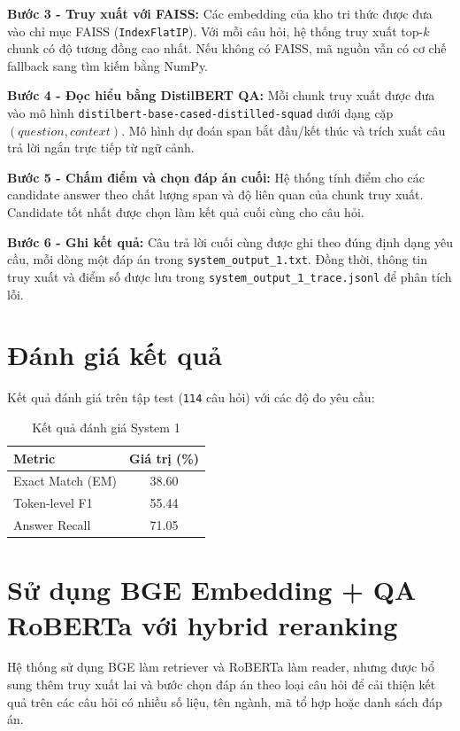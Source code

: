 \documentclass[12pt,a4paper]{report}
\begin{document}
\textbf{Bước 3 - Truy xuất với FAISS:}
Các embedding của kho tri thức được đưa vào chỉ mục FAISS (\texttt{IndexFlatIP}). Với mỗi câu hỏi, hệ thống truy xuất top-\(k\) chunk có độ tương đồng cao nhất. Nếu không có FAISS, mã nguồn vẫn có cơ chế fallback sang tìm kiếm bằng NumPy.

\textbf{Bước 4 - Đọc hiểu bằng DistilBERT QA:}
Mỗi chunk truy xuất được đưa vào mô hình \texttt{distilbert-base-cased-distilled-squad} dưới dạng cặp \((question, context)\). Mô hình dự đoán span bắt đầu/kết thúc và trích xuất câu trả lời ngắn trực tiếp từ ngữ cảnh.

\textbf{Bước 5 - Chấm điểm và chọn đáp án cuối:}
Hệ thống tính điểm cho các candidate answer theo chất lượng span và độ liên quan của chunk truy xuất. Candidate tốt nhất được chọn làm kết quả cuối cùng cho câu hỏi.

\textbf{Bước 6 - Ghi kết quả:}
Câu trả lời cuối cùng được ghi theo đúng định dạng yêu cầu, mỗi dòng một đáp án trong \texttt{system\_output\_1.txt}. Đồng thời, thông tin truy xuất và điểm số được lưu trong \texttt{system\_output\_1\_trace.jsonl} để phân tích lỗi.

\section{Đánh giá kết quả}

Kết quả đánh giá trên tập test (\texttt{114} câu hỏi) với các độ đo yêu cầu:

\begin{table}[H]
\centering
\caption{Kết quả đánh giá System 1}
\begin{tabular}{|l|c|}
\hline
\textbf{Metric} & \textbf{Giá trị (\%)} \\
\hline
Exact Match (EM) & 38.60 \\
\hline
Token-level F1 & 55.44 \\
\hline
Answer Recall & 71.05 \\
\hline
\end{tabular}
\end{table}


\section{Sử dụng BGE Embedding + QA RoBERTa với hybrid reranking}

 Hệ thống sử dụng BGE làm retriever và RoBERTa làm reader, nhưng được bổ sung thêm truy xuất lai và bước chọn đáp án theo loại câu hỏi để cải thiện kết quả trên các câu hỏi có nhiều số liệu, tên ngành, mã tổ hợp hoặc danh sách đáp án.
\end{document}
